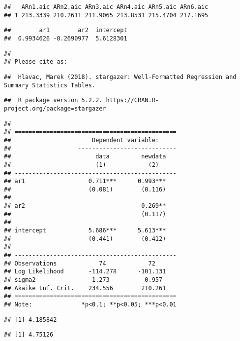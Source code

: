 \documentclass[
]{article}
\begin{document}
\begin{verbatim}
##   ARn1.aic ARn2.aic ARn3.aic ARn4.aic ARn5.aic ARn6.aic
## 1 213.3339 210.2611 211.9065 213.8531 215.4704 217.1695
\end{verbatim}

\begin{verbatim}
##        ar1        ar2  intercept 
##  0.9934626 -0.2690977  5.6128301
\end{verbatim}

\begin{verbatim}
## 
## Please cite as:
\end{verbatim}

\begin{verbatim}
##  Hlavac, Marek (2018). stargazer: Well-Formatted Regression and Summary Statistics Tables.
\end{verbatim}

\begin{verbatim}
##  R package version 5.2.2. https://CRAN.R-project.org/package=stargazer
\end{verbatim}

\begin{verbatim}
## 
## ==============================================
##                       Dependent variable:     
##                   ----------------------------
##                        data         newdata   
##                        (1)            (2)     
## ----------------------------------------------
## ar1                  0.711***      0.993***   
##                      (0.081)        (0.116)   
##                                               
## ar2                                -0.269**   
##                                     (0.117)   
##                                               
## intercept            5.686***      5.613***   
##                      (0.441)        (0.412)   
##                                               
## ----------------------------------------------
## Observations            74            72      
## Log Likelihood       -114.278      -101.131   
## sigma2                1.273          0.957    
## Akaike Inf. Crit.    234.556        210.261   
## ==============================================
## Note:              *p<0.1; **p<0.05; ***p<0.01
\end{verbatim}

\begin{verbatim}
## [1] 4.185842
\end{verbatim}

\begin{verbatim}
## [1] 4.75126
\end{verbatim}
\end{document}
